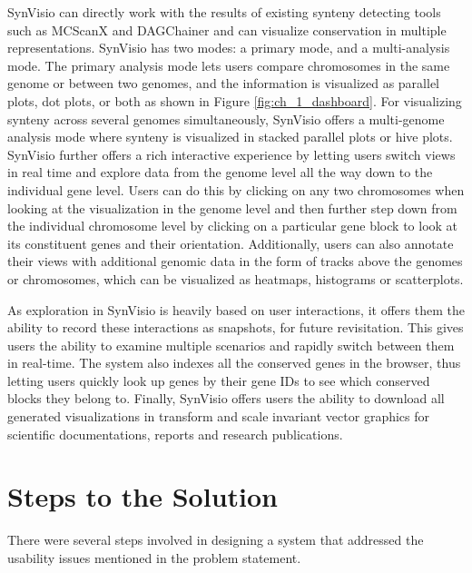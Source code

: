 SynVisio can directly work with the results of existing synteny detecting tools such as MCScanX\cite{wang2012mcscanx} and DAGChainer\cite{haas2004dagchainer} and can visualize conservation in multiple representations. SynVisio has two modes: a primary mode, and a multi-analysis mode. The primary analysis mode lets users compare chromosomes in the same genome or between two genomes, and the information is visualized as parallel plots, dot plots, or both as shown in Figure \ref{fig:ch_1_dashboard}. For visualizing synteny across several genomes simultaneously, SynVisio offers a multi-genome analysis mode where synteny is visualized in stacked parallel plots or hive plots. SynVisio further offers a rich interactive experience by letting users switch views in real time and explore data from the genome level all the way down to the individual gene level. Users can do this by clicking on any two chromosomes when looking at the visualization in the genome level and then further step down from the individual chromosome level by clicking on a particular gene block to look at its constituent genes and their orientation. Additionally, users can also annotate their views with additional genomic data in the form of tracks above the genomes or chromosomes, which can be visualized as heatmaps, histograms or scatterplots.

As exploration in SynVisio is heavily based on user interactions, it offers them the ability to record these interactions as snapshots, for future revisitation. This gives users the ability to examine multiple scenarios and rapidly switch between them in real-time. The system also indexes all the conserved genes in the browser, thus letting users quickly look up genes by their gene IDs to see which conserved blocks they belong to. Finally, SynVisio offers users the ability to download all generated visualizations in transform and scale invariant vector graphics for scientific documentations, reports and research publications.

\section{Steps to the Solution} 
There were several steps involved in designing a system that addressed the usability issues mentioned in the problem statement.

